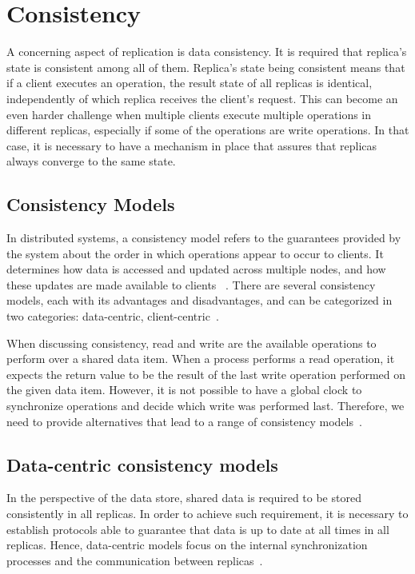 \section{Consistency}
\label{sec:consistency}

A concerning aspect of replication is data consistency. It is required that replica’s state is consistent among all of them. Replica’s state being consistent means that if a client executes an operation, the result state of all replicas is identical, independently of which replica receives the client’s request. This can become an even harder challenge when multiple clients execute multiple operations in different replicas, especially if some of the operations are write operations. In that case, it is necessary to have a mechanism in place that assures that replicas always converge to the same state.

\subsection{Consistency Models}
\label{sec:consistency_models}
In distributed systems, a consistency model refers to the guarantees provided by the system about the order in which operations appear to occur to clients. It determines how data is accessed and updated across multiple nodes, and how these updates are made available to clients ~\cite{consistency-models}. There are several consistency models, each with its advantages and disadvantages, and can be categorized in two categories: data-centric, client-centric~\cite{consistency-models}.

When discussing consistency, read and write are the available operations to perform over a shared data item. When a process performs a read operation, it expects the return value to be the result of the last write operation performed on the given data item. However, it is not possible to have a global clock to synchronize operations and decide which write was performed last. Therefore, we need to provide alternatives that lead to a range of consistency models~\cite{distributed-systems-principles-paradigms}.

\subsection{Data-centric consistency models}
\label{sec:data_centric_consistency_models}
In the perspective of the data store, shared data is required to be stored consistently in all replicas. In order to achieve such requirement, it is necessary to establish protocols able to guarantee that data is up to date at all times in all replicas. Hence, data-centric models focus on the internal synchronization processes and the communication between replicas~\cite{towards-comprehensive-measurement-guarantees}.

